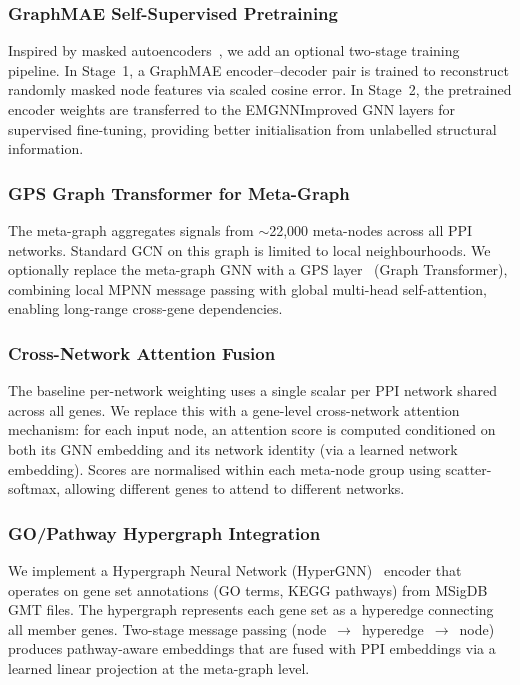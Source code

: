 \subsubsection{GraphMAE Self-Supervised Pretraining}
Inspired by masked autoencoders~\cite{graphmae2022}, we add an optional two-stage training
pipeline. In Stage~1, a GraphMAE encoder--decoder pair is trained to reconstruct randomly
masked node features via scaled cosine error. In Stage~2, the pretrained encoder weights
are transferred to the EMGNNImproved GNN layers for supervised fine-tuning, providing
better initialisation from unlabelled structural information.

\subsubsection{GPS Graph Transformer for Meta-Graph}
The meta-graph aggregates signals from $\sim$22{,}000 meta-nodes across all PPI
networks. Standard GCN on this graph is limited to local neighbourhoods. We optionally
replace the meta-graph GNN with a GPS layer~\cite{gps2022} (Graph Transformer), combining
local MPNN message passing with global multi-head self-attention, enabling long-range
cross-gene dependencies.

\subsubsection{Cross-Network Attention Fusion}
The baseline per-network weighting uses a single scalar per PPI network shared across all
genes. We replace this with a gene-level cross-network attention mechanism: for each input
node, an attention score is computed conditioned on both its GNN embedding and its network
identity (via a learned network embedding). Scores are normalised within each meta-node
group using scatter-softmax, allowing different genes to attend to different networks.

\subsubsection{GO/Pathway Hypergraph Integration}
We implement a Hypergraph Neural Network (HyperGNN)~\cite{hgnn2019} encoder that operates
on gene set annotations (GO terms, KEGG pathways) from MSigDB GMT files. The hypergraph
represents each gene set as a hyperedge connecting all member genes. Two-stage message
passing (node~$\to$~hyperedge~$\to$~node) produces pathway-aware embeddings that are fused
with PPI embeddings via a learned linear projection at the meta-graph level.

